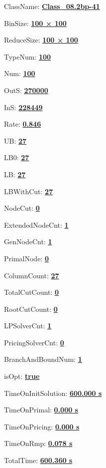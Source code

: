 \documentclass[11pt]{article}
\begin{document}
\pagestyle{empty}


ClassName: \underline{\textbf{Class_08.2bp-41}}
\par
BinSize: \underline{\textbf{100 × 100}}
\par
ReduceSize: \underline{\textbf{100 × 100}}
\par
TypeNum: \underline{\textbf{100}}
\par
Num: \underline{\textbf{100}}
\par
OutS: \underline{\textbf{270000}}
\par
InS: \underline{\textbf{228449}}
\par
Rate: \underline{\textbf{0.846}}
\par
UB: \underline{\textbf{27}}
\par
LB0: \underline{\textbf{27}}
\par
LB: \underline{\textbf{27}}
\par
LBWithCut: \underline{\textbf{27}}
\par
NodeCut: \underline{\textbf{0}}
\par
ExtendedNodeCnt: \underline{\textbf{1}}
\par
GenNodeCnt: \underline{\textbf{1}}
\par
PrimalNode: \underline{\textbf{0}}
\par
ColumnCount: \underline{\textbf{27}}
\par
TotalCutCount: \underline{\textbf{0}}
\par
RootCutCount: \underline{\textbf{0}}
\par
LPSolverCnt: \underline{\textbf{1}}
\par
PricingSolverCnt: \underline{\textbf{0}}
\par
BranchAndBoundNum: \underline{\textbf{1}}
\par
isOpt: \underline{\textbf{true}}
\par
TimeOnInitSolution: \underline{\textbf{600.000 s}}
\par
TimeOnPrimal: \underline{\textbf{0.000 s}}
\par
TimeOnPricing: \underline{\textbf{0.000 s}}
\par
TimeOnRmp: \underline{\textbf{0.078 s}}
\par
TotalTime: \underline{\textbf{600.360 s}}
\par
\newpage


\end{document}
